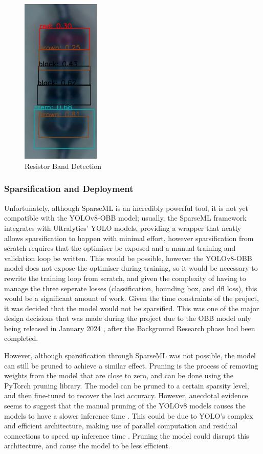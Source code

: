 \begin{figure}[H]
  \hfill
  \begin{minipage}[t]{\textwidth}
    \centering
    \includegraphics[height=8cm]{imgs/cv/banddetection.jpg}
    \caption{Resistor Band Detection}
    \label{fig:band-detection}
  \end{minipage}
\end{figure}

\subsubsection{Sparsification and Deployment}

Unfortunately, although SparseML is an incredibly powerful tool, it is not yet compatible with the YOLOv8-OBB model; usually, the SparseML framework integrates with Ultralytics' YOLO models, providing a wrapper that neatly allows sparsification to happen with minimal effort, however sparsification from scratch requires that the optimiser be exposed and a manual training and validation loop be written. This would be possible, however the YOLOv8-OBB model does not expose the optimiser during training, so it would be necessary to rewrite the training loop from scratch, and given the complexity of having to manage the three seperate losses (classification, bounding box, and dfl loss), this would be a significant amount of work. Given the time constraints of the project, it was decided that the model would not be sparsified. This was one of the major design decisions that was made during the project due to the OBB model only being released in January 2024 \cite{obbrelease}, after the Background Research phase had been completed. 

However, although sparsification through SparseML was not possible, the model can still be pruned to achieve a similar effect. Pruning is the process of removing weights from the model that are close to zero, and can be done using the PyTorch pruning library. The model can be pruned to a certain sparsity level, and then fine-tuned to recover the lost accuracy. However, anecdotal evidence seems to suggest that the manual pruning of the YOLOv8 models causes the models to have a slower inference time \cite{pruning}. This could be due to YOLO's complex and efficient architecture, making use of parallel computation and residual connections to speed up inference time \cite{yolo}. Pruning the model could disrupt this architecture, and cause the model to be less efficient.

